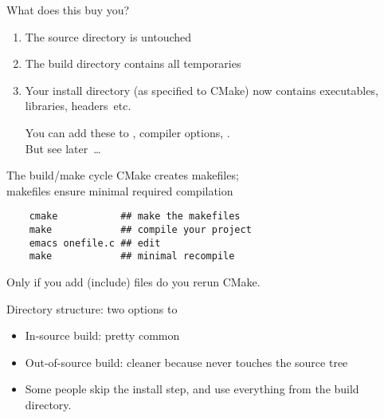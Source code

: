 \begin{numberedframe}{What does this buy you?}
  \begin{enumerate}
  \item The source directory is untouched
  \item The build directory contains all temporaries
  \item 
    Your install directory (as specified to CMake)
    now contains executables, libraries, headers~etc.

  You can add these to , compiler options,
  .\\
  But see later~\ldots
  \end{enumerate}
\end{numberedframe}

\begin{numberedframe}{The build/make cycle}
  CMake creates makefiles;\\
  makefiles ensure minimal required compilation
  \begin{lstlisting}
    cmake           ## make the makefiles
    make            ## compile your project
    emacs onefile.c ## edit
    make            ## minimal recompile
  \end{lstlisting}
  Only if you add (include) files do you rerun CMake.
\end{numberedframe}

\begin{numberedframe}{Directory structure: two options}
  \hbox to \textwidth\bgroup
  \begin{minipage}{.45\textwidth}
  \end{minipage}
  \hss
  \begin{minipage}{.45\textwidth}
  \end{minipage}
  \egroup
  \begin{itemize}
  \item In-source build: pretty common
  \item Out-of-source build: cleaner because never touches the source tree
  \item Some people skip the install step, and use everything from the build directory.
  \end{itemize}
\begin{lstlisting}
\end{lstlisting}
\end{numberedframe}

